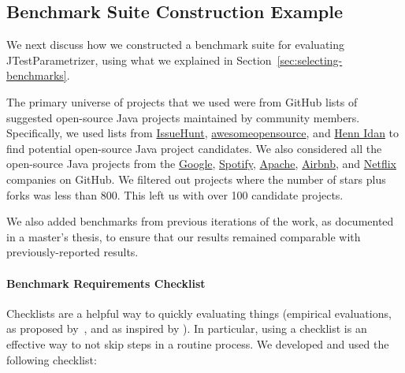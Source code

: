 \subsection{Benchmark Suite Construction Example}
We next discuss how we constructed a benchmark suite for evaluating JTestParametrizer, using what we explained in Section~\ref{sec:selecting-benchmarks}.

The primary universe of projects that we used were from GitHub lists of suggested open-source Java projects maintained by community members. Specifically, we used lists from \href{https://medium.com/issuehunt/50-top-java-projects-on-github-adbfe9f67dbc}{IssueHunt}, \href{https://awesomeopensource.com/projects/maven-plugin}{awesomeopensource}, and \href{https://www.overops.com/blog/the-hitchhikers-guide-to-github-13-java-projects-you-should-try/}{Henn Idan} to find potential open-source Java project candidates. 
We also considered all the open-source Java projects from the \href{https://github.com/google/?q=&type=&language=java&sort=stargazers}{Google}, \href{https://github.com/spotify/?q=&type=&language=java&sort=stargazers}{Spotify}, \href{https://github.com/apache/?q=&type=&language=java&sort=stargazers}{Apache}, \href{https://github.com/airbnb/?q=&type=&language=java&sort=stargazers}{Airbnb}, and \href{https://github.com/Netflix?q=&type=&language=java&sort=stargazers}{Netflix} companies on GitHub. We filtered out projects where the number of stars plus forks was less than 800. This left us with over 100 candidate projects.

We also added benchmarks from previous iterations of the work, as documented in a master's thesis, to ensure that our results remained comparable with previously-reported results.

\paragraph{Benchmark Requirements Checklist}
Checklists are a helpful way to quickly evaluating things (empirical evaluations, as proposed by~, and as inspired by \cite{gawande09:_check_manif}). In particular, using a checklist is an effective way to not skip steps in a routine process. We developed and used the following checklist:

